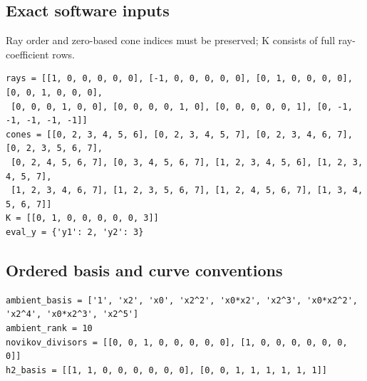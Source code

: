 \documentclass[10pt,a4paper]{article}
\begin{document}
\subsection*{Exact software inputs}
Ray order and zero-based cone indices must be preserved; K consists of full ray-coefficient rows.
\begin{lstlisting}
rays = [[1, 0, 0, 0, 0, 0], [-1, 0, 0, 0, 0, 0], [0, 1, 0, 0, 0, 0], [0, 0, 1, 0, 0, 0],
 [0, 0, 0, 1, 0, 0], [0, 0, 0, 0, 1, 0], [0, 0, 0, 0, 0, 1], [0, -1, -1, -1, -1, -1]]
cones = [[0, 2, 3, 4, 5, 6], [0, 2, 3, 4, 5, 7], [0, 2, 3, 4, 6, 7], [0, 2, 3, 5, 6, 7],
 [0, 2, 4, 5, 6, 7], [0, 3, 4, 5, 6, 7], [1, 2, 3, 4, 5, 6], [1, 2, 3, 4, 5, 7],
 [1, 2, 3, 4, 6, 7], [1, 2, 3, 5, 6, 7], [1, 2, 4, 5, 6, 7], [1, 3, 4, 5, 6, 7]]
K = [[0, 1, 0, 0, 0, 0, 0, 3]]
eval_y = {'y1': 2, 'y2': 3}
\end{lstlisting}
\subsection*{Ordered basis and curve conventions}
\begin{lstlisting}
ambient_basis = ['1', 'x2', 'x0', 'x2^2', 'x0*x2', 'x2^3', 'x0*x2^2', 'x2^4', 'x0*x2^3', 'x2^5']
ambient_rank = 10
novikov_divisors = [[0, 0, 1, 0, 0, 0, 0, 0], [1, 0, 0, 0, 0, 0, 0, 0]]
h2_basis = [[1, 1, 0, 0, 0, 0, 0, 0], [0, 0, 1, 1, 1, 1, 1, 1]]
\end{lstlisting}
\end{document}
